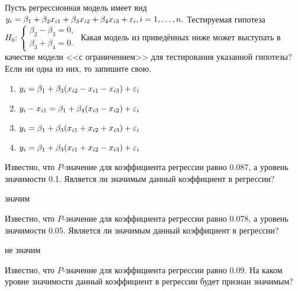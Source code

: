 \documentclass[pdftex,11pt,openany]{book}\usepackage[]{graphicx}\usepackage[]{color}
\begin{document}
\begin{solution}
\end{solution}


\begin{problem}
 Пусть регрессионная модель имеет вид $y_i= \beta_1+ \beta_2 x_{i1}+ \beta_3 x_{i2}+ \beta_4 x_{i3}+\varepsilon_i, i=1,\dots,n.$ Тестируемая гипотеза 
$H_0:
  \begin{cases}
    \beta_2 - \beta_3=0, \\
    \beta_3 + \beta_4=0. 
 \end{cases}$
Какая модель из приведённых ниже может выступать в качестве модели <<с ограничением>> для тестирования указанной гипотезы? Если ни одна из них, то запишите свою.
\begin{enumerate}
\item $y_i = \beta_1 + \beta_3 (x_{i2}-x_{i1}-x_{i3})+ \varepsilon_i$
\item $y_i-x_{i1} = \beta_1+ \beta_4 (x_{i3}-x_{i2})+ \varepsilon_i$
\item $y_i = \beta_1+ \beta_3 (x_{i1}+x_{i2}+x_{i3})+ \varepsilon_i$
\item $y_i = \beta_1+ \beta_3 (x_{i1}+x_{i2}-x_{i3})+ \varepsilon_i$
\end{enumerate}
\end{problem}

\begin{solution}
\end{solution}


\begin{problem}
  Известно, что $P$-значение для коэффициента регрессии равно 0.087, а уровень значимости 0.1. Является ли значимым данный коэффициент в регрессии?
\end{problem}

\begin{solution}
значим
\end{solution}


\begin{problem}
 Известно, что $P$-значение для коэффициента регрессии равно 0.078, а уровень значимости 0.05. Является ли значимым данный коэффициент в регрессии?
\end{problem}

\begin{solution}
не значим
\end{solution}


\begin{problem}
  Известно, что $P$-значение для коэффициента регрессии равно 0.09. На каком
уровне значимости данный коэффициент в регрессии будет признан значимым?
\end{problem}
\end{document}
